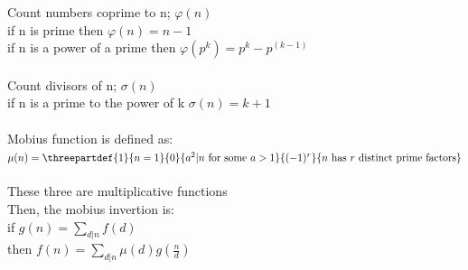 Count numbers coprime to n; $\varphi(n)$\\
if n is prime then $\varphi(n) = n - 1$\\
if n is a power of a prime then $\varphi(p^k) = p^k - p^(k-1)$\\
\\
Count divisors of n; $\sigma(n)$\\
if n is a prime to the power of k $\sigma(n) = k + 1$\\
\\
Mobius function is defined as: \\
$\mu(n) = \threepartdef
{1}      {n=1}
{0}      {a^2 | n \mbox{ for some } a > 1}
{(-1)^r} {n \mbox{ has } r \mbox{ distinct prime factors}}$\\
\\
These three are multiplicative functions\\
Then, the mobius invertion is:\\
if $g(n) = \sum_{d|n} f(d)$ \\
then $f(n) = \sum_{d|n} \mu(d)g(\frac{n}{d})$